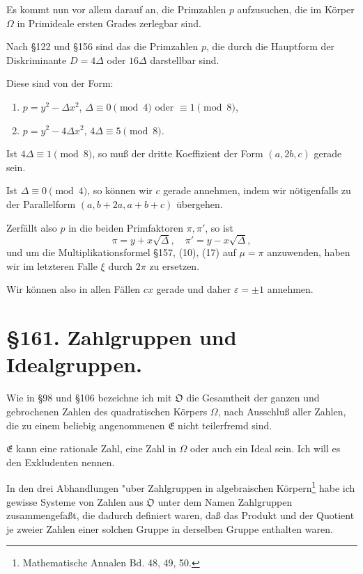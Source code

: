 \documentclass[12pt,a4paper]{article}
\begin{document}
Es kommt nun vor allem darauf an, die Primzahlen $p$ aufzusuchen, die im K\"orper $\Omega$ in Primideale ersten Grades zerlegbar sind.

Nach \S 122 und \S 156 sind das die Primzahlen $p$, die durch die Hauptform der Diskriminante $D = 4\Delta$ oder $16\Delta$ darstellbar sind.

Diese sind von der Form:
\begin{enumerate}
\item $p = y^2 - \Delta x^2$, $\Delta \equiv 0 \pmod{4}$ oder $\equiv 1 \pmod{8}$,
\item $p = y^2 - 4\Delta x^2$, $4\Delta \equiv 5 \pmod{8}$.
\end{enumerate}

Ist $4\Delta \equiv 1 \pmod{8}$, so mu\ss{} der dritte Koeffizient der Form $(a, 2b, c)$ gerade sein.

Ist $\Delta \equiv 0 \pmod{4}$, so k\"onnen wir $c$ gerade annehmen, indem wir n\"otigenfalls zu der Parallelform $(a, b + 2a, a + b + c)$ \"ubergehen.

Zerf\"allt also $p$ in die beiden Primfaktoren $\pi, \pi'$, so ist
\begin{equation}\pi = y + x\sqrt{\Delta}, \quad \pi' = y - x\sqrt{\Delta},\end{equation}
und um die Multiplikationsformel \S 157, (10), (17) auf $\mu = \pi$ anzuwenden, haben wir im letzteren Falle $\xi$ durch $2\pi$ zu ersetzen.

Wir k\"onnen also in allen F\"allen $cx$ gerade und daher $\varepsilon = \pm 1$ annehmen.

\section*{\S 161. Zahlgruppen und Idealgruppen.}

Wie in \S 98 und \S 106 bezeichne ich mit $\mathfrak{O}$ die Gesamtheit der ganzen und gebrochenen Zahlen des quadratischen K\"orpers $\Omega$, nach Ausschlu\ss{} aller Zahlen, die zu einem beliebig angenommenen $\mathfrak{E}$ nicht teilerfremd sind.

$\mathfrak{E}$ kann eine rationale Zahl, eine Zahl in $\Omega$ oder auch ein Ideal sein. Ich will es den Exkludenten nennen.

In den drei Abhandlungen "uber Zahlgruppen in algebraischen K\"orpern\footnote{Mathematische Annalen Bd. 48, 49, 50.} habe ich gewisse Systeme von Zahlen aus $\mathfrak{O}$ unter dem Namen Zahlgruppen zusammengefa\ss{}t, die dadurch definiert waren, da\ss{} das Produkt und der Quotient je zweier Zahlen einer solchen Gruppe in derselben Gruppe enthalten waren.
\end{document}

